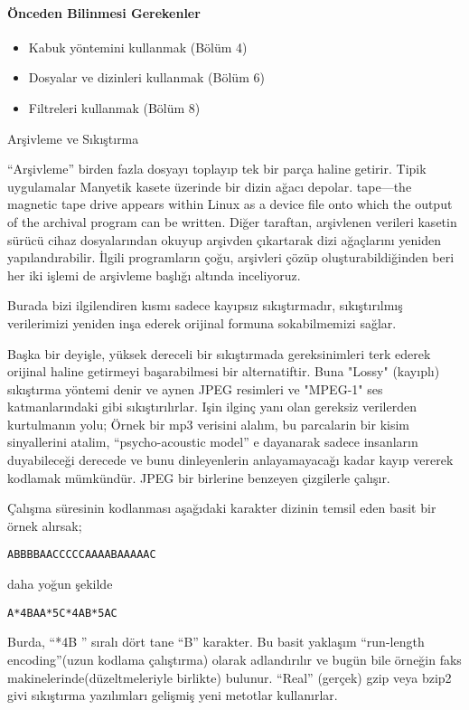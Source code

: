 \documentclass[10pt,a5paper]{book}
\begin{document}
\paragraph{Önceden Bilinmesi Gerekenler}
\begin{itemize}
 \item Kabuk yöntemini kullanmak (Bölüm 4)
 \item Dosyalar ve dizinleri kullanmak (Bölüm 6)
 \item Filtreleri kullanmak (Bölüm 8)
 \end{itemize}

\begin{section}{Arşivleme ve Sıkıştırma}

“Arşivleme” birden fazla dosyayı toplayıp tek bir parça haline getirir. Tipik uygulamalar Manyetik kasete üzerinde bir dizin ağacı depolar. tape—the magnetic tape drive appears within Linux as a device file onto which the output of the archival program can be written. Diğer taraftan, arşivlenen verileri kasetin sürücü cihaz dosyalarından okuyup arşivden çıkartarak dizi ağaçlarını yeniden yapılandırabilir. İlgili programların çoğu, arşivleri
çözüp oluşturabildiğinden beri her iki işlemi de arşivleme başlığı altında inceliyoruz. 

Burada bizi ilgilendiren kısmı sadece kayıpsız sıkıştırmadır, sıkıştırılmış verilerimizi yeniden inşa ederek orijinal formuna sokabilmemizi sağlar.

Başka bir deyişle, yüksek dereceli bir sıkıştırmada gereksinimleri terk ederek orijinal haline getirmeyi başarabilmesi bir alternatiftir. Buna "Lossy" (kayıplı) sıkıştırma yöntemi denir  ve aynen JPEG resimleri ve "MPEG-1" ses katmanlarındaki gibi sıkıştırılırlar. Işin ilginç yanı olan gereksiz verilerden kurtulmanın yolu; Örnek bir mp3 verisini alalım, bu parcalarin bir kisim sinyallerini atalim, “psycho-acoustic model” e dayanarak sadece insanların duyabileceği derecede ve bunu dinleyenlerin anlayamayacağı kadar kayıp vererek kodlamak mümkündür. JPEG bir birlerine benzeyen çizgilerle çalışır.

Çalışma süresinin kodlanması aşağıdaki karakter dizinin temsil eden basit bir örnek alırsak;
\begin{verbatim}
ABBBBAACCCCCAAAABAAAAAC
\end{verbatim}

daha yoğun şekilde
\begin{verbatim}
A*4BAA*5C*4AB*5AC
\end{verbatim}

Burda, “*4B ” sıralı dört tane “B” karakter. Bu basit yaklaşım “run-length encoding”(uzun kodlama çalıştırma) olarak adlandırılır ve bugün bile örneğin faks makinelerinde(düzeltmeleriyle birlikte) bulunur. “Real” (gerçek) gzip veya bzip2 givi sıkıştırma yazılımları gelişmiş yeni metotlar kullanırlar.


\end{section}
\end{document}
